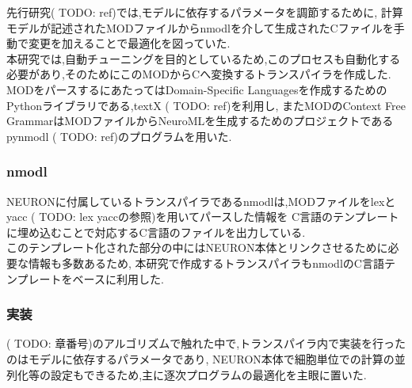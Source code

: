 先行研究( TODO: ref)では,モデルに依存するパラメータを調節するために,
計算モデルが記述されたMODファイルからnmodlを介して生成されたCファイルを手動で変更を加えることで最適化を図っていた.\\
本研究では,自動チューニングを目的としているため,このプロセスも自動化する必要があり,そのためにこのMODからCへ変換するトランスパイラを作成した.\\
MODをパースするにあたってはDomain-Specific Languagesを作成するためのPythonライブラリである,textX ( TODO: ref)を利用し,
またMODのContext Free GrammarはMODファイルからNeuroMLを生成するためのプロジェクトであるpynmodl ( TODO: ref)のプログラムを用いた.\\

\subsubsection{nmodl}
NEURONに付属しているトランスパイラであるnmodlは,MODファイルをlexとyacc ( TODO: lex yaccの参照)を用いてパースした情報を
C言語のテンプレートに埋め込むことで対応するC言語のファイルを出力している.\\
このテンプレート化された部分の中にはNEURON本体とリンクさせるために必要な情報も多数あるため,
本研究で作成するトランスパイラもnmodlのC言語テンプレートをベースに利用した.\\

\subsubsection{実装}
( TODO: 章番号)のアルゴリズムで触れた中で,トランスパイラ内で実装を行ったのはモデルに依存するパラメータであり,
NEURON本体で細胞単位での計算の並列化等の設定もできるため,主に逐次プログラムの最適化を主眼に置いた.\\

